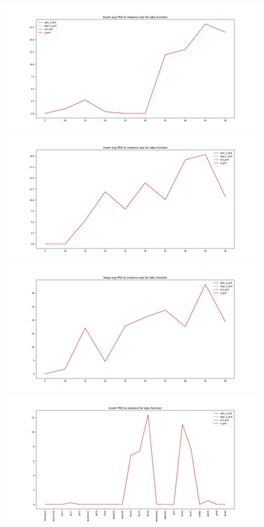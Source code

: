 \documentclass{article}
\begin{document}
\begin{multicols}{2}
  \begin{center}
    \includegraphics[scale=0.2]{rand_tabu_inv_prd.png}
    \includegraphics[scale=0.2]{rand_tabu_ins_prd.png}
    \includegraphics[scale=0.2]{rand_tabu_swp_prd.png}
    \includegraphics[scale=0.2]{tabu_inv_prd.png}

\end{center}
\end{multicols}
\end{document}

